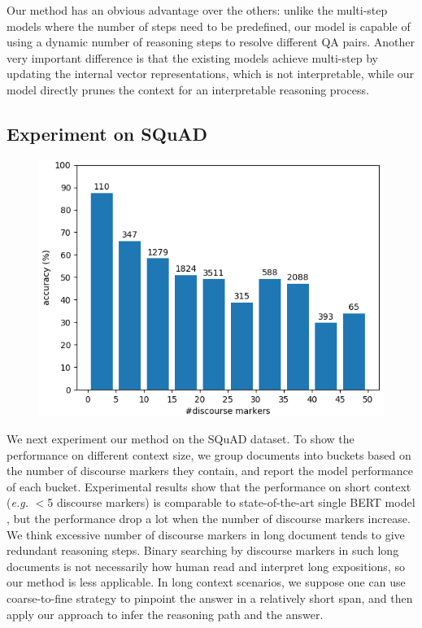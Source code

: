 Our method has an obvious advantage over the others: unlike the multi-step models where the number of steps need to be predefined, our model is capable of using a dynamic number of reasoning steps to resolve different QA pairs. Another very important difference is that the existing models achieve multi-step by updating the internal vector representations, which is not interpretable, while our model directly prunes the context for an interpretable reasoning process.

\subsection{Experiment on SQuAD}

\begin{figure}
 \centering
 \includegraphics[width=0.9\linewidth]{fig/squad.png}
 \caption{}
 \label{fig:squad}
\vspace{-2ex}
\end{figure}

 We next experiment our method on the SQuAD dataset. To show the performance on different context size, we group documents into buckets based on the number of discourse markers they contain, and report the model performance of each bucket. Experimental results show that the performance on short context (\emph{e.g.} $<$5 discourse markers) is comparable to state-of-the-art single BERT model \cite{DBLP:journals/corr/abs-1810-04805}, but the performance drop a lot when the number of discourse markers increase. We think excessive number of discourse markers in long document tends to give redundant reasoning steps. Binary searching by discourse markers in such long documents is not necessarily how human read and interpret long expositions, so our method is less applicable. In long context scenarios, we suppose one can use coarse-to-fine strategy to pinpoint the answer in a relatively short span, and then apply our approach to infer the reasoning path and the answer. 